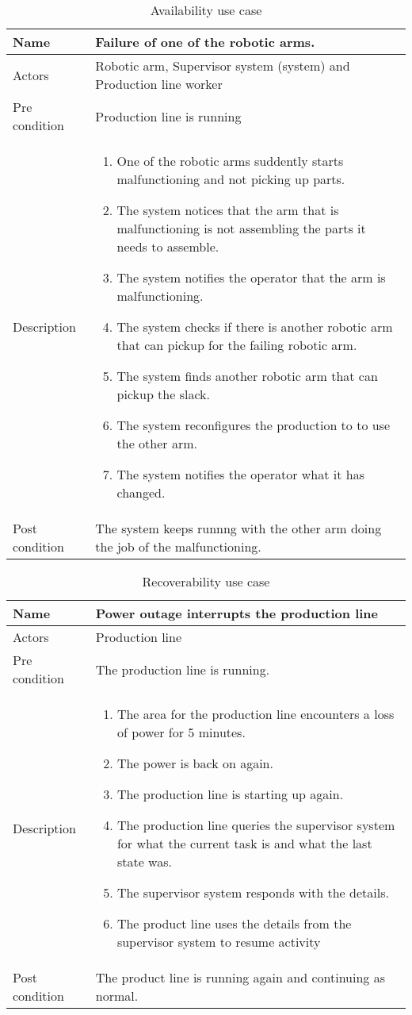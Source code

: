 \begin{table}[h]
\caption{Availability use case}
\centering
\begin{tabular}{|l|p{8cm}|} \hline
Name & Failure of one of the robotic arms. \\ \hline
Actors & Robotic arm, Supervisor system (system) and Production line worker \\ \hline
Pre condition & Production line is running  \\ \hline
Description & \begin{enumerate} 
\item One of the robotic arms suddently starts malfunctioning and not picking up parts.
\item The system notices that the arm that is malfunctioning is not assembling the parts it needs to assemble.
\item The system notifies the operator that the arm is malfunctioning.
\item The system checks if there is another robotic arm that can pickup for the failing robotic arm.
\item The system finds another robotic arm that can pickup the slack.
\item The system reconfigures the production to to use the other arm.
\item The system notifies the operator what it has changed.
\end{enumerate} \\ \hline
Post condition & The system keeps runnng with the other arm doing the job of the malfunctioning. \\
\hline
\end{tabular}
\end{table}

\begin{table}[h]
\caption{Recoverability use case}
\centering
\begin{tabular}{|l|p{8cm}|} \hline
Name & Power outage interrupts the production line \\ \hline
Actors & Production line \\ \hline
Pre condition & The production line is running.  \\ \hline
Description & \begin{enumerate} 
\item The area for the production line encounters a loss of power for 5 minutes.
\item The power is back on again.
\item The production line is starting up again.
\item The production line queries the supervisor system for what the current task is and what the last state was.
\item The supervisor system responds with the details.
\item The product line uses the details from the supervisor system to resume activity
\end{enumerate} \\ \hline
Post condition & The product line is running again and continuing as normal. \\
\hline
\end{tabular}
\end{table}
